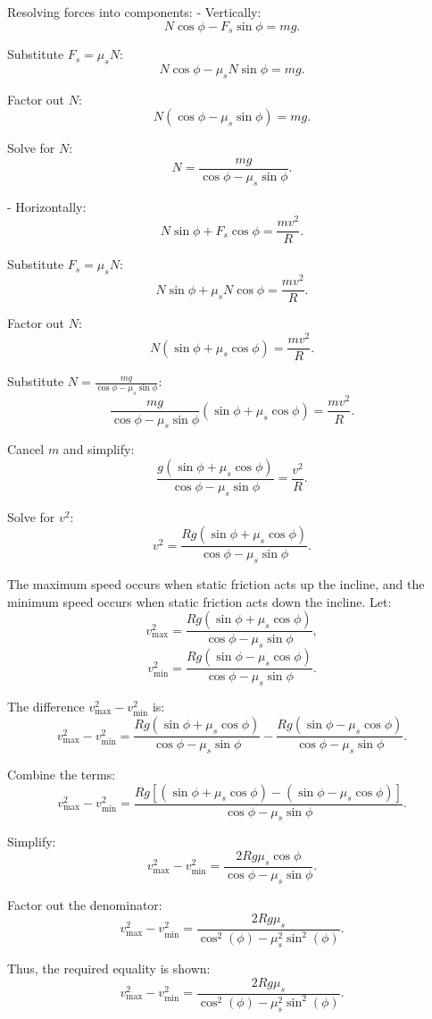 Resolving forces into components:
- Vertically:
\[
N \cos\phi - F_s \sin\phi = mg.
\]

Substitute $F_s = \mu_s N$:
\[
N \cos\phi - \mu_s N \sin\phi = mg.
\]

Factor out $N$:
\[
N (\cos\phi - \mu_s \sin\phi) = mg.
\]

Solve for $N$:
\[
N = \frac{mg}{\cos\phi - \mu_s \sin\phi}.
\]

- Horizontally:
\[
N \sin\phi + F_s \cos\phi = \frac{mv^2}{R}.
\]

Substitute $F_s = \mu_s N$:
\[
N \sin\phi + \mu_s N \cos\phi = \frac{mv^2}{R}.
\]

Factor out $N$:
\[
N (\sin\phi + \mu_s \cos\phi) = \frac{mv^2}{R}.
\]

Substitute $N = \frac{mg}{\cos\phi - \mu_s \sin\phi}$:
\[
\frac{mg}{\cos\phi - \mu_s \sin\phi} (\sin\phi + \mu_s \cos\phi) = \frac{mv^2}{R}.
\]

Cancel $m$ and simplify:
\[
\frac{g (\sin\phi + \mu_s \cos\phi)}{\cos\phi - \mu_s \sin\phi} = \frac{v^2}{R}.
\]

Solve for $v^2$:
\[
v^2 = \frac{Rg (\sin\phi + \mu_s \cos\phi)}{\cos\phi - \mu_s \sin\phi}.
\]

The maximum speed occurs when static friction acts up the incline, and the minimum speed occurs when static friction acts down the incline. Let:
\[
v_{\text{max}}^2 = \frac{Rg (\sin\phi + \mu_s \cos\phi)}{\cos\phi - \mu_s \sin\phi},
\]
\[
v_{\text{min}}^2 = \frac{Rg (\sin\phi - \mu_s \cos\phi)}{\cos\phi - \mu_s \sin\phi}.
\]

The difference $v_{\text{max}}^2 - v_{\text{min}}^2$ is:
\[
v_{\text{max}}^2 - v_{\text{min}}^2 = \frac{Rg (\sin\phi + \mu_s \cos\phi)}{\cos\phi - \mu_s \sin\phi} - \frac{Rg (\sin\phi - \mu_s \cos\phi)}{\cos\phi - \mu_s \sin\phi}.
\]

Combine the terms:
\[
v_{\text{max}}^2 - v_{\text{min}}^2 = \frac{Rg [(\sin\phi + \mu_s \cos\phi) - (\sin\phi - \mu_s \cos\phi)]}{\cos\phi - \mu_s \sin\phi}.
\]

Simplify:
\[
v_{\text{max}}^2 - v_{\text{min}}^2 = \frac{2Rg \mu_s \cos\phi}{\cos\phi - \mu_s \sin\phi}.
\]

Factor out the denominator:
\[
v_{\text{max}}^2 - v_{\text{min}}^2 = \frac{2Rg\mu_s}{\cos^2(\phi) - \mu_s^2\sin^2(\phi)}.
\]

Thus, the required equality is shown:
\[
\boxed{v_{\text{max}}^2 - v_{\text{min}}^2 = \frac{2Rg\mu_s}{\cos^2(\phi) - \mu_s^2\sin^2(\phi)}}.
\]

